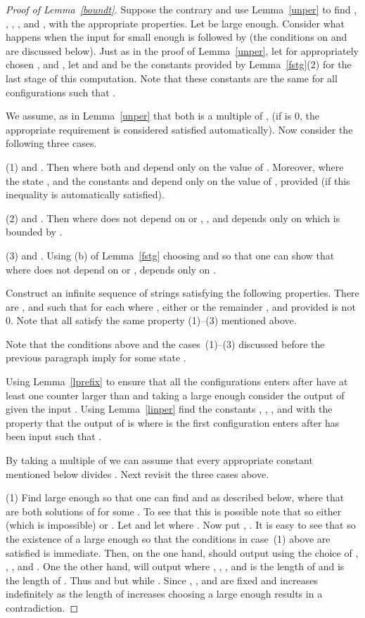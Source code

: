 \documentclass[12pt]{article}
\begin{document}
\begin{proof}[Proof of Lemma~\ref{boundt}]
Suppose the contrary and use Lemma~\ref{unper} to find , ,
, ,  and , with the
appropriate properties.  Let  be large enough. Consider what
happens when the input  for small enough  is
followed by  (the conditions on  and  are
discussed below).  Just as in the proof of Lemma~\ref{unper}, let
 for appropriately chosen ,
 and , let and  and  be the constants
provided by Lemma~\ref{fstg}(2) for the last stage of this
computation. Note that these constants are the same for all
configurations  such that
.

We assume, as in Lemma~\ref{unper} that both  is a multiple of
,  (if  is 0, the appropriate
requirement is considered satisfied automatically). Now consider the
following three cases.

(1)  and . Then
 where both 
and  depend only on the value of . Moreover,
 where the
state , and the constants  and  depend only on the value of
, provided  (if  this
inequality is automatically satisfied).

(2)  and . Then
 where  does not depend on 
or , , and  depends only
on  which is bounded by .

(3)  and . Using (b) of Lemma~\ref{fstg}
choosing  and  so that  one can show that
 where  does not depend on
 or ,  depends only on .

Construct an infinite sequence of strings  satisfying the following properties. There are , and
 such that for each   where
, either  or the remainder
, and  provided  is not 0. Note that all
 satisfy the same property (1)--(3) mentioned
above.

Note that the conditions above and the cases~(1)--(3) discussed before
the previous paragraph imply for some state 
.

Using Lemma~\ref{lprefix} to ensure that all the configurations 
enters after  have at least one counter
larger than  and taking a large enough  consider the output of
 given the input . Using Lemma~\ref{linper} find
the constants , , , and  with the property that the output
of  is  where  is
the first configuration  enters after  has been input
such that .

By taking a multiple of  we can assume that every appropriate
constant mentioned below divides . Next revisit the three cases
above.

(1) Find  large enough so that one can find  and  as
described below, where  that are both solutions of
 for some .  To see that this is
possible note that  so either  (which is
impossible) or .  Let  and let
 where . Now
put , . It is easy to see that 
so the existence of a large enough  so that the conditions in
case~(1) above are satisfied is immediate.  Then, on the one hand, 
should output  using the choice
of , , , and . One the other hand,  will output
 where ,
, , and  is the length of 
and  is the length of . Thus  and  but  while . Since , , and
 are fixed and  increases indefinitely as the length of 
increases choosing a large enough  results in a contradiction.


\end{proof}
\end{document}
